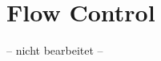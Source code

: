 \documentclass[a4paper,
			llpt,
			solution,
			accentcolor=tud2d,
			colorbacktitle
			]
			{tudexercise}
\begin{document}
\section{Flow Control}
-- nicht bearbeitet --
\end{document}
